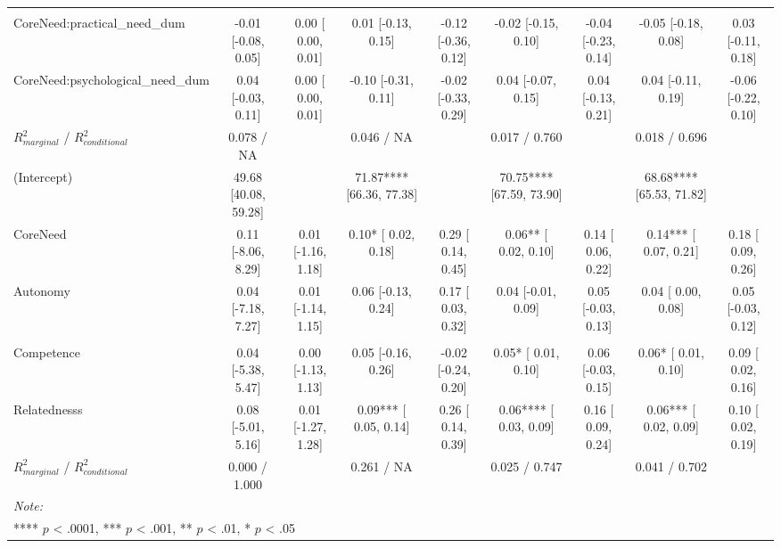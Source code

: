 \begin{table}
\begin{minipage}[t][\textheight][t]{\textwidth}
{\begin{tabular}[t]{lcccccccc}
\addlinespace[0.3em]
\multicolumn{9}{l}{\textbf{Specific Psychological Needs}}\\
\hspace{1em}CoreNeed:practical_need_dum & -0.01 [-0.08,  0.05] & 0.00 [ 0.00, 0.01] & 0.01 [-0.13,  0.15] & -0.12 [-0.36, 0.12] & -0.02 [-0.15,  0.10] & -0.04 [-0.23, 0.14] & -0.05 [-0.18,  0.08] & 0.03 [-0.11, 0.18]\\
\hspace{1em}CoreNeed:psychological_need_dum & 0.04 [-0.03,  0.11] & 0.00 [ 0.00, 0.01] & -0.10 [-0.31,  0.11] & -0.02 [-0.33, 0.29] & 0.04 [-0.07,  0.15] & 0.04 [-0.13, 0.21] & 0.04 [-0.11,  0.19] & -0.06 [-0.22, 0.10]\\
\hspace{1em}$R^2_{marginal}$ / $R^2_{conditional}$ & 0.078 / NA &  & 0.046 / NA &  & 0.017 / 0.760 &  & 0.018 / 0.696 & \\
\hspace{1em}(Intercept) & 49.68 [40.08, 59.28] &  & 71.87**** [66.36, 77.38] &  & 70.75**** [67.59, 73.90] &  & 68.68**** [65.53, 71.82] & \\
\hspace{1em}CoreNeed & 0.11 [-8.06,  8.29] & 0.01 [-1.16, 1.18] & 0.10* [ 0.02,  0.18] & 0.29 [ 0.14, 0.45] & 0.06** [ 0.02,  0.10] & 0.14 [ 0.06, 0.22] & 0.14*** [ 0.07,  0.21] & 0.18 [ 0.09, 0.26]\\
\hspace{1em}Autonomy & 0.04 [-7.18,  7.27] & 0.01 [-1.14, 1.15] & 0.06 [-0.13,  0.24] & 0.17 [ 0.03, 0.32] & 0.04 [-0.01,  0.09] & 0.05 [-0.03, 0.13] & 0.04 [ 0.00,  0.08] & 0.05 [-0.03, 0.12]\\
\addlinespace[0.3em]
\multicolumn{9}{l}{\textbf{Well-being Outcome}}\\
\hspace{1em}Competence & 0.04 [-5.38,  5.47] & 0.00 [-1.13, 1.13] & 0.05 [-0.16,  0.26] & -0.02 [-0.24, 0.20] & 0.05* [ 0.01,  0.10] & 0.06 [-0.03, 0.15] & 0.06* [ 0.01,  0.10] & 0.09 [ 0.02, 0.16]\\
\hspace{1em}Relatednesss & 0.08 [-5.01,  5.16] & 0.01 [-1.27, 1.28] & 0.09*** [ 0.05,  0.14] & 0.26 [ 0.14, 0.39] & 0.06**** [ 0.03,  0.09] & 0.16 [ 0.09, 0.24] & 0.06*** [ 0.02,  0.09] & 0.10 [ 0.02, 0.19]\\
\hspace{1em}$R^2_{marginal}$ / $R^2_{conditional}$ & 0.000 / 1.000 &  & 0.261 / NA &  & 0.025 / 0.747 &  & 0.041 / 0.702 & \\
\bottomrule
\multicolumn{9}{l}{\rule{0pt}{1em}\textit{Note: }}\\
\multicolumn{9}{l}{\rule{0pt}{1em}**** $p$ < .0001, *** $p$ < .001, ** $p$ < .01, * $p$ < .05}\\
\end{tabular}}
\end{minipage}
\end{table}
